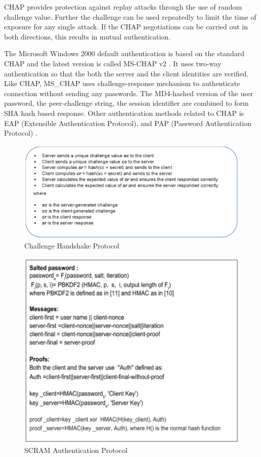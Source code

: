 \begin{multicols}{2}
CHAP provides protection against replay attacks through the use of random challenge value. Further the challenge can be used repeatedly to limit the time of exposure for any single attack. If the CHAP negotiations can be carried out in both directions, this results in mutual authentication.

The Microsoft Windows 2000 default authentication is based on the standard CHAP and the latest version is called MS-CHAP v2 \cite{chap2-key4}. It uses two-way authentication so that the both the server and the client identities are verified. Like CHAP, MS\_CHAP uses challenge-response mechanism to authenticate connection without sending any passwords. The MD4-hashed version of the user password, the peer-challenge string, the session identifier are combined to form SHA hash based response. Other authentication methods related to CHAP is EAP (Extensible Authentication Protocol), and PAP (Password Authentication Protocol) \cite{chap2-key4}.
\end{multicols}

\eject

\begin{figure}[!ht]
\centering
\includegraphics[scale=.85]{src/Figures/chap2/1.eps}
\caption{Challenge Handshake Protocol}\label{chap2-fig1}
\end{figure}

\begin{figure}[!ht]
\centering
\includegraphics[scale=.8]{src/Figures/chap2/2.eps}
\caption{SCRAM Authentication Protocol}\label{chap2-fig2}
\end{figure}

